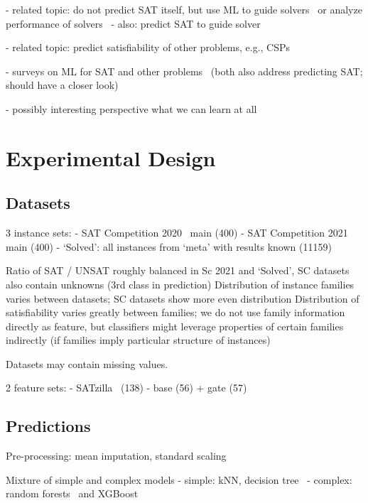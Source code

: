 \documentclass{article}
\begin{document}
- related topic: do not predict SAT itself, but use ML to guide solvers~\cite{amizadeh2019pdp} or analyze performance of solvers~\cite{hutter2013identifying}
- also: predict SAT to guide solver~\cite{wu2017improving}

- related topic: predict satisfiability of other problems, e.g., CSPs~\cite{xu2018towards, liu2020learning}

- surveys on ML for SAT and other problems~\cite{amrani2018ml, popescu2021overview} (both also address predicting SAT; should have a closer look)

- possibly interesting perspective what we can learn at all~\cite{yehuda2020its}

\section{Experimental Design}
\label{sec:experimental-design}

\subsection{Datasets}

3 instance sets:
- SAT Competition 2020~\cite{balyo2020proceedings} main (400)
- SAT Competition 2021~\cite{balyo2021proceedings} main (400)
- `Solved': all instances from `meta' with results known (11159)

Ratio of SAT / UNSAT roughly balanced in Sc 2021 and `Solved', SC datasets also contain unknowns (3rd class in prediction)
Distribution of instance families varies between datasets; SC datasets show more even distribution
Distribution of satisfiability varies greatly between families; we do not use family information directly as feature, but classifiers might leverage properties of certain families indirectly (if families imply particular structure of instances)

Datasets may contain missing values.

2 feature sets:
- SATzilla~\cite{xu2012features} (138)
- base (56) + gate (57)

\subsection{Predictions}

Pre-processing: mean imputation, standard scaling

Mixture of simple and complex models
- simple: kNN, decision tree~\cite{breiman1984classification}
- complex: random forests~\cite{breiman2001random} and XGBoost~\cite{chen2016xgboost}
\end{document}
